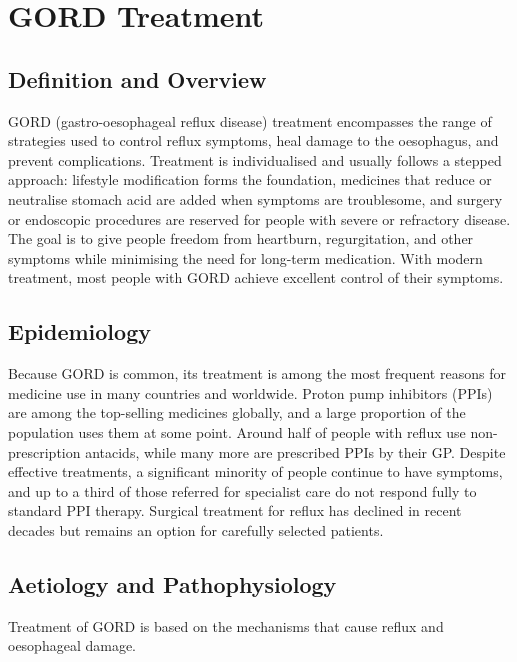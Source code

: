 \chapter{GORD Treatment}

\section*{Definition and Overview}
GORD (gastro-oesophageal reflux disease) treatment encompasses the range of strategies used to control reflux symptoms, heal damage to the oesophagus, and prevent complications. Treatment is individualised and usually follows a stepped approach: lifestyle modification forms the foundation, medicines that reduce or neutralise stomach acid are added when symptoms are troublesome, and surgery or endoscopic procedures are reserved for people with severe or refractory disease. The goal is to give people freedom from heartburn, regurgitation, and other symptoms while minimising the need for long-term medication. With modern treatment, most people with GORD achieve excellent control of their symptoms.

\section*{Epidemiology}
Because GORD is common, its treatment is among the most frequent reasons for medicine use in many countries and worldwide. Proton pump inhibitors (PPIs) are among the top-selling medicines globally, and a large proportion of the population uses them at some point. Around half of people with reflux use non-prescription antacids, while many more are prescribed PPIs by their GP. Despite effective treatments, a significant minority of people continue to have symptoms, and up to a third of those referred for specialist care do not respond fully to standard PPI therapy. Surgical treatment for reflux has declined in recent decades but remains an option for carefully selected patients.

\section*{Aetiology and Pathophysiology}
Treatment of GORD is based on the mechanisms that cause reflux and oesophageal damage.

